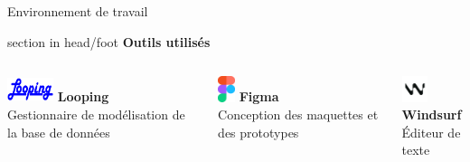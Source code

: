 \documentclass{beamer}
\begin{document}
\begin{frame}[label=environnement]{Environnement de travail}
	\begin{beamercolorbox}[wd=\paperwidth,ht=1.5em,dp=0.5em,leftskip=0.5cm]{section in head/foot}
  		\large \textbf{Outils utilisés}
	\end{beamercolorbox}
	\vspace{0.5em}
	\begin{center}
  		\begin{minipage}{0.9\textwidth}
  			\begin{columns}[T, onlytextwidth]
        				
        				\begin{minipage}[t][2cm][t]{\linewidth}
        					\raggedright
         				\includegraphics[width=1.35cm, height=0.75cm, keepaspectratio]{../img/logo_looping.png} 
         				\hspace{0.1cm} \textbf{Looping} \\ 
         				Gestionnaire de modélisation de la base de données
          		  	\end{minipage}
          			\vspace{0.7em}
          			\pause
          			
        				\begin{minipage}[t][2cm][t]{\linewidth}
        					\raggedright
          				\includegraphics[height=0.75cm]{../img/logo_figma.png}
          				\hspace{0.95cm} \textbf{Figma} \\
          				Conception des maquettes et des prototypes
          			\end{minipage}
          			\vspace{0.7em}
          			\pause
          		
          			\begin{minipage}[t][2cm][t]{\linewidth}
          				\raggedright
          				\includegraphics[width=0.75cm, height=0.75cm]{../img/logo_windsurf.png}
          				\hspace{0.6cm} \textbf{Windsurf} \\ 
          				Éditeur de texte
          			\end{minipage}
          			\pause
          			

\end{columns}
\end{minipage}
\end{center}
\end{frame}
\end{document}

